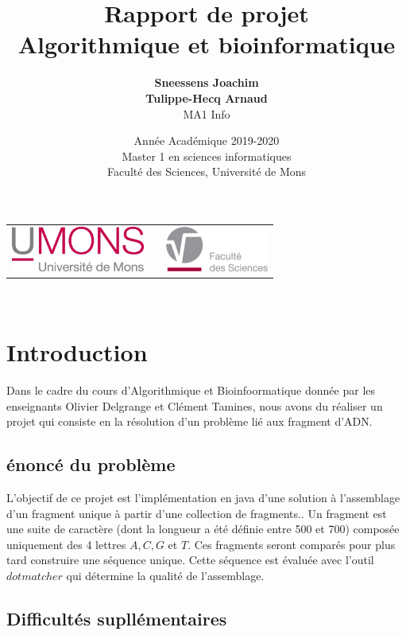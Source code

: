 \documentclass{article}
\title{
{\Huge \textbf{Rapport de projet}\\
Algorithmique et bioinformatique}}
\author{\textbf{Sneessens Joachim}\\\textbf{Tulippe-Hecq Arnaud}\\MA1 Info}
\date{Année Académique 2019-2020\\
Master 1 en sciences informatiques\\
\vspace{1cm}
Faculté des Sciences, Université de Mons}
\begin{document}
\maketitle

\vspace{9cm}

\begin{center}
\begin{tabular}[t]{c c c}
\includegraphics[height=1.5cm]{logoumons.jpg} &
\hspace{1cm} &
\includegraphics[height=1.5cm]{logofs.jpg}
\end{tabular}
\end{center}~\\



\newpage

\section{Introduction}

Dans le cadre du cours d'Algorithmique et Bioinfoormatique donnée par les enseignants Olivier Delgrange et Clément Tamines, nous avons du réaliser un projet qui consiste en la résolution d'un problème lié aux fragment d'ADN.

\subsection{énoncé du problème}

L'objectif de ce projet est l'implémentation en java d'une solution à l'assemblage d'un fragment unique à partir d'une collection de fragments.. Un fragment est une suite de caractère (dont la longueur a été définie entre 500 et 700) composée uniquement des 4 lettres $ A, C, G $ et $T$. Ces fragments seront comparés pour plus tard construire une séquence unique. Cette séquence est évaluée avec l'outil $dotmatcher$ qui détermine la qualité de l'assemblage.


\subsection{Difficultés supllémentaires}
\end{document}
